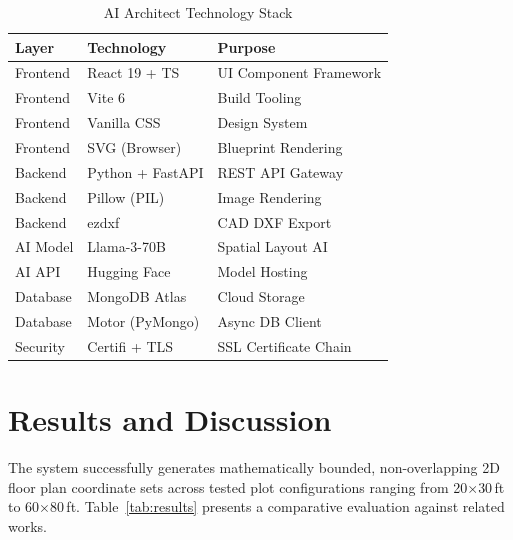 \documentclass[10pt, twocolumn, letterpaper]{article}
\begin{document}
\begin{table}[ht]
\caption{AI Architect Technology Stack}
\label{tab:stack}
\centering
\fontsize{8}{10}\selectfont
\renewcommand{\arraystretch}{1.2}
\begin{tabular}{@{}lll@{}}
\toprule
\textbf{Layer} & \textbf{Technology} & \textbf{Purpose} \\
\midrule
Frontend  & React 19 + TS    & UI Component Framework \\
Frontend  & Vite 6           & Build Tooling \\
Frontend  & Vanilla CSS      & Design System \\
Frontend  & SVG (Browser)    & Blueprint Rendering \\
Backend   & Python + FastAPI & REST API Gateway \\
Backend   & Pillow (PIL)     & Image Rendering \\
Backend   & ezdxf            & CAD DXF Export \\
AI Model  & Llama-3-70B      & Spatial Layout AI \\
AI API    & Hugging Face     & Model Hosting \\
Database  & MongoDB Atlas    & Cloud Storage \\
Database  & Motor (PyMongo)  & Async DB Client \\
Security  & Certifi + TLS    & SSL Certificate Chain \\
\bottomrule
\end{tabular}
\end{table}

\section{Results and Discussion}

The system successfully generates mathematically bounded, non-overlapping 2D
floor plan coordinate sets across tested plot configurations ranging from
20$\times$30\,ft to 60$\times$80\,ft. Table~\ref{tab:results} presents a
comparative evaluation against related works.
\end{document}
